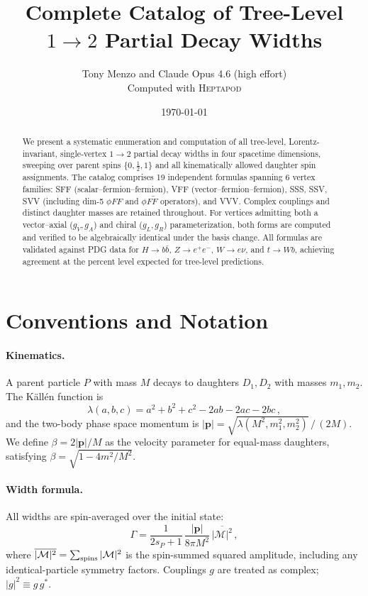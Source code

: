 \documentclass[11pt,a4paper]{article}
\title{Complete Catalog of Tree-Level $1\to 2$ Partial Decay Widths}
\author{Tony Menzo and Claude Opus 4.6 (high effort)\\[4pt]
\small Computed with \textsc{Heptapod}}
\date{\today}
\newcommand{\Msq}{\overline{|\mathcal{M}|^2}}
\newcommand{\la}{\lambda}
\newcommand{\beq}{\begin{equation}}
\newcommand{\eeq}{\end{equation}}
\newcommand{\conj}[1]{#1^{*}}
\begin{document}
\maketitle

\begin{abstract}
We present a systematic enumeration and computation of all tree-level, Lorentz-invariant,
single-vertex $1\to 2$ partial decay widths in four spacetime dimensions, sweeping over parent
spins $\{0,\tfrac{1}{2},1\}$ and all kinematically allowed daughter spin assignments.
The catalog comprises 19 independent formulas spanning 6 vertex families: SFF (scalar--fermion--fermion),
VFF (vector--fermion--fermion), SSS, SSV, SVV (including dim-5 $\phi FF$ and $\phi F\tilde{F}$ operators),
and VVV. Complex couplings and distinct daughter masses are retained throughout. For vertices admitting
both a vector--axial ($g_V, g_A$) and chiral ($g_L, g_R$) parameterization, both forms are computed
and verified to be algebraically identical under the basis change. All formulas are validated against
PDG data for $H\to b\bar{b}$, $Z\to e^+e^-$, $W\to e\nu$, and $t\to Wb$, achieving agreement
at the percent level expected for tree-level predictions.
\end{abstract}

\tableofcontents

\section{Conventions and Notation}
\label{sec:conventions}

\paragraph{Kinematics.}
A parent particle $P$ with mass $M$ decays to daughters $D_1, D_2$ with masses $m_1, m_2$.
The K\"all\'en function is
\beq
\la(a,b,c) = a^2 + b^2 + c^2 - 2ab - 2ac - 2bc\,,
\eeq
and the two-body phase space momentum is $|\mathbf{p}| = \sqrt{\la(M^2, m_1^2, m_2^2)}\,/\,(2M)$.
We define $\beta = 2|\mathbf{p}|/M$ as the velocity parameter for equal-mass daughters, satisfying $\beta = \sqrt{1 - 4m^2/M^2}$.

\paragraph{Width formula.}
All widths are spin-averaged over the initial state:
\beq
\Gamma = \frac{1}{2s_P + 1}\,\frac{|\mathbf{p}|}{8\pi M^2}\,\Msq\,,
\eeq
where $\Msq = \sum_{\rm spins}|\mathcal{M}|^2$ is the spin-summed squared amplitude, including
any identical-particle symmetry factors. Couplings $g$ are treated as complex;
$|g|^2 \equiv g\,\conj{g}$.
\end{document}
